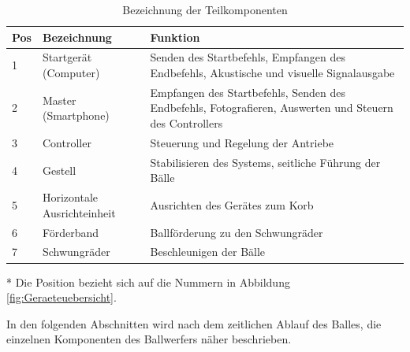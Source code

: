 \begin{table}[h!]
		\centering
	\begin{threeparttable} 
		\begin{tabular}{p{6mm}p{4.2cm}p{\textwidth-8cm}}
		    \textbf{Pos}\tnote{*} & \textbf{Bezeichnung} & \textbf{Funktion} \\ 
			\hline\rule{0pt}{11pt} 1 & Startgerät (Computer) & Senden des Startbefehls, Empfangen des Endbefehls, 
			Akustische und visuelle Signalausgabe \\ 
			    \rule{0pt}{11pt}   2 & Master  (Smartphone) & Empfangen des Startbefehls, Senden des Endbefehls,
			Fotografieren, Auswerten und Steuern des Controllers \\ 
			  \rule{0pt}{11pt}     3 & Controller & Steuerung und Regelung der Antriebe \\ 
			  \rule{0pt}{11pt}     4 & Gestell & Stabilisieren des Systems,	seitliche Führung der Bälle \\ 
			   \rule{0pt}{11pt}    5 & Horizontale Ausrichteinheit & Ausrichten des Gerätes zum Korb \\ 
			   \rule{0pt}{11pt}    6 & Förderband & Ballförderung zu den Schwungräder \\ 
			   \rule{0pt}{11pt}    7 & Schwungräder & Beschleunigen der Bälle \\ 
		\end{tabular}
		\caption{Bezeichnung der Teilkomponenten}	
		\label{tab:BezTeilkomponenten}
		\begin{tablenotes}\footnotesize 
			\item[*] Die Position bezieht sich auf die Nummern in Abbildung \ref{fig:Geraeteuebersicht}.
		\end{tablenotes}
	\end{threeparttable} 
\end{table}
\noindent In den folgenden Abschnitten wird nach dem zeitlichen Ablauf des Balles, 
die einzelnen Komponenten des Ballwerfers näher beschrieben. 